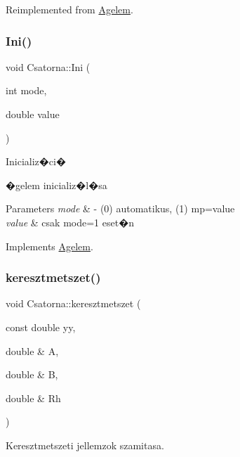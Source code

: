 Reimplemented from \hyperlink{class_agelem_a2e6c4688cdbdf17c6d3bde0c6c08ff49}{Agelem}.

\hypertarget{class_csatorna_ab30adea649ae8708061e211dc450cb06}{}\label{class_csatorna_ab30adea649ae8708061e211dc450cb06} 
\subsubsection{\texorpdfstring{Ini()}{Ini()}}
{\footnotesize\ttfamily void Csatorna\+::\+Ini (\begin{DoxyParamCaption}\item[{int}]{mode,  }\item[{double}]{value }\end{DoxyParamCaption})\hspace{0.3cm}{\ttfamily [virtual]}}



Inicializ�ci� 

�gelem inicializ�l�sa


\begin{DoxyParams}{Parameters}
{\em mode} & -\/ (0) automatikus, (1) mp=value \\
\hline
{\em value} & csak mode=1 eset�n \\
\hline
\end{DoxyParams}


Implements \hyperlink{class_agelem_a844171faf01143770bbd894b1a48e72f}{Agelem}.

\hypertarget{class_csatorna_ab9528187fc3d40d210c85b72d7856f10}{}\label{class_csatorna_ab9528187fc3d40d210c85b72d7856f10} 
\subsubsection{\texorpdfstring{keresztmetszet()}{keresztmetszet()}}
{\footnotesize\ttfamily void Csatorna\+::keresztmetszet (\begin{DoxyParamCaption}\item[{const double}]{yy,  }\item[{double \&}]{A,  }\item[{double \&}]{B,  }\item[{double \&}]{Rh }\end{DoxyParamCaption})}



Keresztmetszeti jellemzok szamitasa. 

